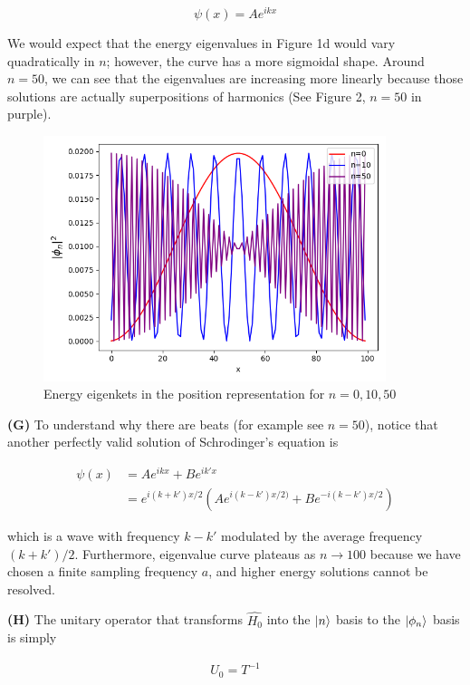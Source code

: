 \documentclass[12pt]{article}
\theoremstyle{definition}
\begin{document}
{\begin{equation*}
\psi(x) = Ae^{ikx}
\end{equation*}

We would expect that the energy eigenvalues in Figure 1d would vary quadratically in $n$; however, the curve has a more sigmoidal shape. Around $n=50$, we can see that the eigenvalues are increasing more linearly because those solutions are actually superpositions of harmonics (See Figure 2, $n=50$ in purple). 

\begin{figure}[t!]
\centering
\includegraphics[width=10cm]{Figure_2}
\caption{Energy eigenkets in the position representation for $n=0,10,50$}
\label{fig:method}
\end{figure}

\vspace{0.1in}
\noindent \textbf{(G)} To understand why there are beats (for example see $n=50$), notice that another perfectly valid solution of Schrodinger's equation is


\begin{align*}
\psi(x) &= Ae^{ikx} + Be^{ik'x} \\
&= e^{i(k+k')x/2}\left(Ae^{i(k-k')x/2)} + Be^{-i(k-k')x/2}\right)
\end{align*}

which is a wave with frequency $k-k'$ modulated by the average frequency $(k+k')/2$. 
Furthermore, eigenvalue curve plateaus as $n\rightarrow 100$ because we have chosen a finite sampling frequency $a$, and higher energy solutions cannot be resolved.

\vspace{0.1in}
\noindent \textbf{(H)} The unitary operator that transforms $\hat{H_{0}}$ into the $\ket{n}$ basis to the $\ket{\phi_{n}}$ basis is simply

\begin{align*}
U_{0} = T^{-1}
\end{align*}

}
\end{document}
